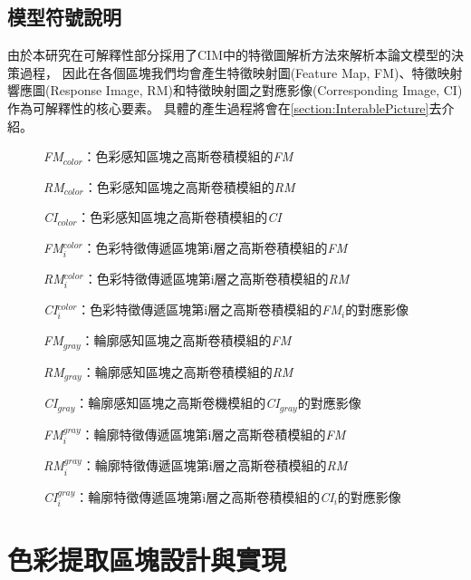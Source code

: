 \documentclass[class=NCU_thesis, crop=false]{standalone}
\begin{document}
\pagebreak

\subsection{模型符號說明}
	由於本研究在可解釋性部分採用了CIM中的特徵圖解析方法來解析本論文模型的決策過程，
	因此在各個區塊我們均會產生特徵映射圖(Feature Map, FM)、特徵映射響應圖(Response Image, RM)和特徵映射圖之對應影像(Corresponding Image, CI)作為可解釋性的核心要素。
	具體的產生過程將會在\cref{section:InterablePicture}去介紹。

	\begin{description}
		\item[]\textit{FM}$_{color}$：色彩感知區塊之高斯卷積模組的\textit{FM}
		\item[]\textit{RM}$_{color}$：色彩感知區塊之高斯卷積模組的\textit{RM}
		\item[]\textit{CI}$_{color}$：色彩感知區塊之高斯卷積模組的\textit{CI}

		\item[]\textit{FM}$^{color}_{i}$：色彩特徵傳遞區塊第i層之高斯卷積模組的\textit{FM}
		\item[]\textit{RM}$^{color}_{i}$：色彩特徵傳遞區塊第i層之高斯卷積模組的\textit{RM}
		\item[]\textit{CI}$^{color}_{i}$：色彩特徵傳遞區塊第i層之高斯卷積模組的\textit{FM}$_{i}$的對應影像
		
		\item[]\textit{FM}$_{gray}$：輪廓感知區塊之高斯卷積模組的\textit{FM}
		\item[]\textit{RM}$_{gray}$：輪廓感知區塊之高斯卷積模組的\textit{RM}
		\item[]\textit{CI}$_{gray}$：輪廓感知區塊之高斯卷機模組的\textit{CI}$_{gray}$的對應影像

		\item[]\textit{FM}$^{gray}_{i}$：輪廓特徵傳遞區塊第i層之高斯卷積模組的\textit{FM}
		\item[]\textit{RM}$^{gray}_{i}$：輪廓特徵傳遞區塊第i層之高斯卷積模組的\textit{RM}
		\item[]\textit{CI}$^{gray}_{i}$：輪廓特徵傳遞區塊第i層之高斯卷積模組的\textit{CI}$_{i}$的對應影像
	\end{description}

\pagebreak

\section{色彩提取區塊設計與實現}
\end{document}
